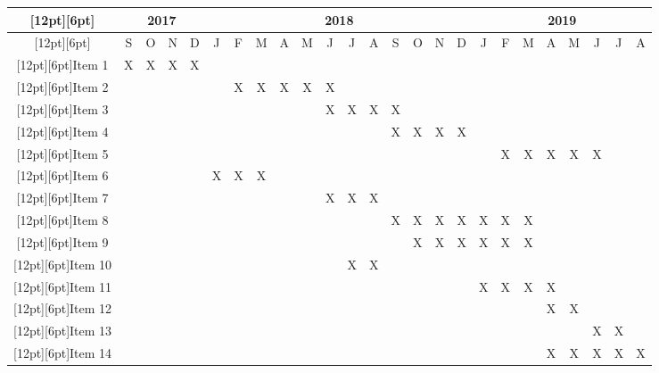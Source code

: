 \documentclass[a4paper,11pt,oneside]{article}
\begin{document}
\begin{landscape}
	\centering
\begin{adjustbox}{width=\textheight, totalheight=\textwidth,keepaspectratio}
	\begin{tabular}{|c|c|c|c|c|c|c|c|c|c|c|c|c|c|c|c|c|c|c|c|c|c|c|c|c|}
		\hline
		\raisebox{0pt}[12pt][6pt]  & \multicolumn{4}{|c|}{2017} & \multicolumn{12}{|c|}{2018} & \multicolumn{8}{|c|}{2019} \\
		\hline
		\raisebox{0pt}[12pt][6pt]	        &S&O&N&D&J&F&M&A&M&J&J&A&S&O&N&D&J&F&M&A&M&J&J&A\\
		\hline
		\raisebox{0pt}[12pt][6pt]{Item 1}	&X&X&X&X& & & & & & & & & & & & & & & & & & & & \\
		\hline
		\raisebox{0pt}[12pt][6pt]{Item 2}       & & & & & &X&X&X&X&X& & & & & & & & & & & & & & \\
		\hline
		\raisebox{0pt}[12pt][6pt]{Item 3}	& & & & & & & & & &X&X&X&X& & & & & & & & & & & \\
		\hline
		\raisebox{0pt}[12pt][6pt]{Item 4}       & & & & & & & & & & & & &X&X&X&X& & & & & & & & \\
		\hline
		\raisebox{0pt}[12pt][6pt]{Item 5}       & & & & & & & & & & & & & & & & & &X&X&X&X&X& & \\
		\hline
		\raisebox{0pt}[12pt][6pt]{Item 6}	& & & & &X&X&X& & & & & & & & & & & & & & & & & \\
		\hline
		\raisebox{0pt}[12pt][6pt]{Item 7}	& & & & & & & & & &X&X&X& & & & & & & & & & & & \\
		\hline
		\raisebox{0pt}[12pt][6pt]{Item 8}       & & & & & & & & & & & & &X&X&X&X&X&X&X& & & & & \\
		\hline
		\raisebox{0pt}[12pt][6pt]{Item 9}       & & & & & & & & & & & & & &X&X&X&X&X&X& & & & & \\
		\hline
		\raisebox{0pt}[12pt][6pt]{Item 10}      & & & & & & & & & & &X&X& & & & & & & & & & & & \\
		\hline
		\raisebox{0pt}[12pt][6pt]{Item 11}	& & & & & & & & & & & & & & & & &X&X&X&X& & & & \\
		\hline
		\raisebox{0pt}[12pt][6pt]{Item 12}      & & & & & & & & & & & & & & & & & & & &X&X& & & \\
		\hline
		\raisebox{0pt}[12pt][6pt]{Item 13}      & & & & & & & & & & & & & & & & & & & & & &X&X& \\
		\hline
		\raisebox{0pt}[12pt][6pt]{Item 14}      & & & & & & & & & & & & & & & & & & & &X&X&X&X&X\\
		\hline
	\end{tabular}
\end{adjustbox}
\end{landscape}
\end{document}
